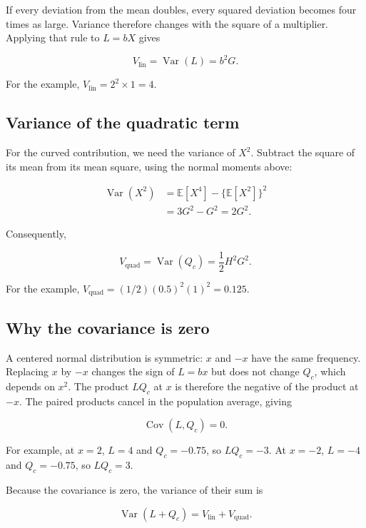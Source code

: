 \documentclass[11pt]{article}
\newcommand{\E}{\mathbb{E}}
\newcommand{\Var}{\operatorname{Var}}
\newcommand{\Cov}{\operatorname{Cov}}
\newcommand{\Vlin}{\ensuremath{V_{\mathrm{lin}}}}
\newcommand{\Vquad}{\ensuremath{V_{\mathrm{quad}}}}
\begin{document}
If every deviation from the mean doubles, every squared deviation becomes four times as large. Variance therefore changes with the square of a multiplier. Applying that rule to $L=bX$ gives

\begin{equation}
\Vlin=\Var(L)=b^2G.
\label{eq:guide-vlin-one}
\end{equation}

For the example, $\Vlin=2^2\times1=4$.

\subsection{Variance of the quadratic term}

For the curved contribution, we need the variance of $X^2$. Subtract the square of its mean from its mean square, using the normal moments above:

\begin{align}
\Var(X^2)
&=\E[X^4]-\{\E[X^2]\}^2\nonumber\\
&=3G^2-G^2=2G^2.
\end{align}

Consequently,

\begin{equation}
\Vquad=\Var(Q_c)=\frac12H^2G^2.
\label{eq:guide-vquad-one}
\end{equation}

For the example, $\Vquad=(1/2)(0.5)^2(1)^2=0.125$.

\subsection{Why the covariance is zero}

A centered normal distribution is symmetric: $x$ and $-x$ have the same
frequency.  Replacing $x$ by $-x$ changes the sign of $L=bx$ but does not
change $Q_c$, which depends on $x^2$.  The product $LQ_c$ at $x$ is therefore
the negative of the product at $-x$.  The paired products cancel in the
population average, giving

\begin{equation}
\Cov(L,Q_c)=0.
\end{equation}

For example, at $x=2$, $L=4$ and $Q_c=-0.75$, so $LQ_c=-3$.  At $x=-2$,
$L=-4$ and $Q_c=-0.75$, so $LQ_c=3$.

Because the covariance is zero, the variance of their sum is

\begin{equation}
\Var(L+Q_c)=\Vlin+\Vquad.
\end{equation}
\end{document}
